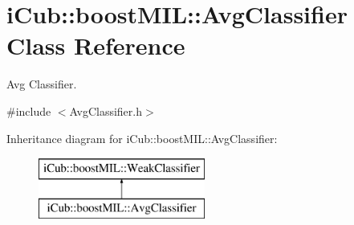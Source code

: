 \section{i\+Cub\+:\+:boost\+M\+I\+L\+:\+:Avg\+Classifier Class Reference}
\label{classiCub_1_1boostMIL_1_1AvgClassifier}


Avg Classifier.  




{\ttfamily \#include $<$Avg\+Classifier.\+h$>$}

Inheritance diagram for i\+Cub\+:\+:boost\+M\+I\+L\+:\+:Avg\+Classifier\+:\begin{figure}[H]
\begin{center}
\leavevmode
\includegraphics[height=2.000000cm]{classiCub_1_1boostMIL_1_1AvgClassifier}
\end{center}
\end{figure}
